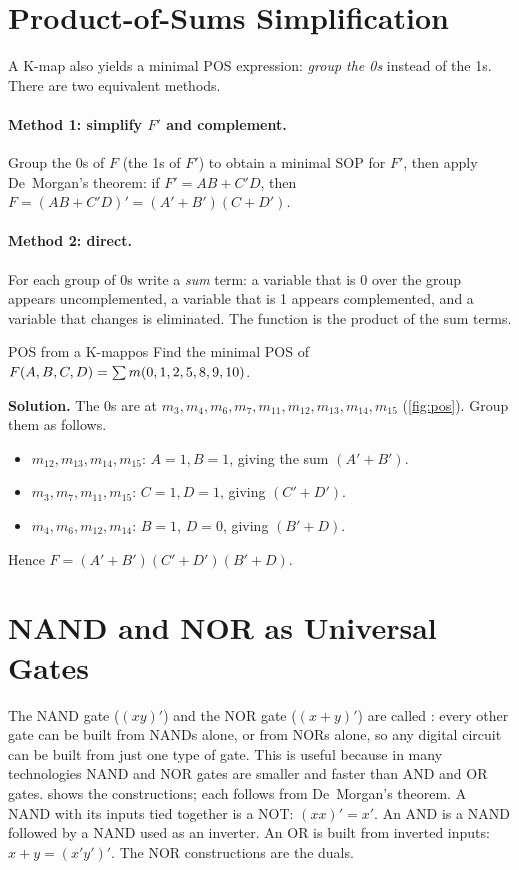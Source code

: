 \section{Product-of-Sums Simplification}
A K-map also yields a minimal POS expression: \emph{group the 0s} instead of the 1s. There are two equivalent methods.

\paragraph{Method 1: simplify $F'$ and complement.} Group the 0s of $F$ (the 1s of $F'$) to obtain a minimal SOP for $F'$, then apply De~Morgan's theorem: if $F'=AB+C'D$, then $F=(AB+C'D)'=(A'+B')(C+D')$.

\paragraph{Method 2: direct.} For each group of 0s write a \emph{sum} term: a variable that is 0 over the group appears uncomplemented, a variable that is 1 appears complemented, and a variable that changes is eliminated. The function is the product of the sum terms.

\begin{example}{POS from a K-map}{pos}
Find the minimal POS of $F(A,B,C,D)=\sum m(0,1,2,5,8,9,10)$.

\textbf{Solution.} The 0s are at $m_3,m_4,m_6,m_7,m_{11},m_{12},m_{13},m_{14},m_{15}$ (\cref{fig:pos}). Group them as follows.
\begin{itemize}
  \item $m_{12},m_{13},m_{14},m_{15}$: $A=1,B=1$, giving the sum $(A'+B')$.
  \item $m_3,m_7,m_{11},m_{15}$: $C=1,D=1$, giving $(C'+D')$.
  \item $m_4,m_6,m_{12},m_{14}$: $B=1$, $D=0$, giving $(B'+D)$.
\end{itemize}
Hence $F=(A'+B')(C'+D')(B'+D)$.
\end{example}


\section{NAND and NOR as Universal Gates}
The NAND gate ($(xy)'$) and the NOR gate ($(x+y)'$) are called : every other gate can be built from NANDs alone, or from NORs alone, so any digital circuit can be built from just one type of gate. This is useful because in many technologies NAND and NOR gates are smaller and faster than AND and OR gates.  shows the constructions; each follows from De~Morgan's theorem. A NAND with its inputs tied together is a NOT: $(xx)'=x'$. An AND is a NAND followed by a NAND used as an inverter. An OR is built from inverted inputs: $x+y=(x'y')'$. The NOR constructions are the duals.

